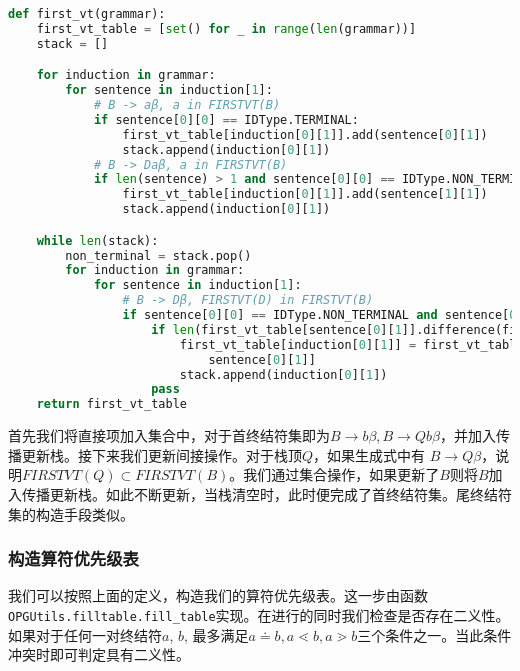 \begin{lstlisting}[caption=构建首终结符集，\texttt{OPGUtils.construct}, language=python]
def first_vt(grammar):
    first_vt_table = [set() for _ in range(len(grammar))]
    stack = []

    for induction in grammar:
        for sentence in induction[1]:
            # B -> aβ, a in FIRSTVT(B)
            if sentence[0][0] == IDType.TERMINAL:
                first_vt_table[induction[0][1]].add(sentence[0][1])
                stack.append(induction[0][1])
            # B -> Daβ, a in FIRSTVT(B)
            if len(sentence) > 1 and sentence[0][0] == IDType.NON_TERMINAL and sentence[1][0] == IDType.TERMINAL:
                first_vt_table[induction[0][1]].add(sentence[1][1])
                stack.append(induction[0][1])

    while len(stack):
        non_terminal = stack.pop()
        for induction in grammar:
            for sentence in induction[1]:
                # B -> Dβ, FIRSTVT(D) in FIRSTVT(B)
                if sentence[0][0] == IDType.NON_TERMINAL and sentence[0][1] == non_terminal:
                    if len(first_vt_table[sentence[0][1]].difference(first_vt_table[induction[0][1]])):
                        first_vt_table[induction[0][1]] = first_vt_table[induction[0][1]] | first_vt_table[
                            sentence[0][1]]
                        stack.append(induction[0][1])
                    pass
    return first_vt_table
\end{lstlisting}

首先我们将直接项加入集合中，对于首终结符集即为$B\rightarrow b\beta, B \rightarrow Qb\beta$，并加入传播更新栈。接下来我们更新间接操作。对于栈顶$Q$，如果生成式中有 $B\rightarrow Q\beta $，说明$FIRSTVT(Q) \subset FIRSTVT(B)$。我们通过集合操作，如果更新了$B$则将$B$加入传播更新栈。如此不断更新，当栈清空时，此时便完成了首终结符集。尾终结符集的构造手段类似。

\subsubsection*{构造算符优先级表}

我们可以按照上面的定义，构造我们的算符优先级表。这一步由函数\texttt{OPGUtils.\allowbreak{}filltable.\allowbreak{}fill\_table}实现。在进行的同时我们检查是否存在二义性。如果对于任何一对终结符$a$, $b$, 最多满足$a \doteq b, a \lessdot b, a \gtrdot b$三个条件之一。当此条件冲突时即可判定具有二义性。

